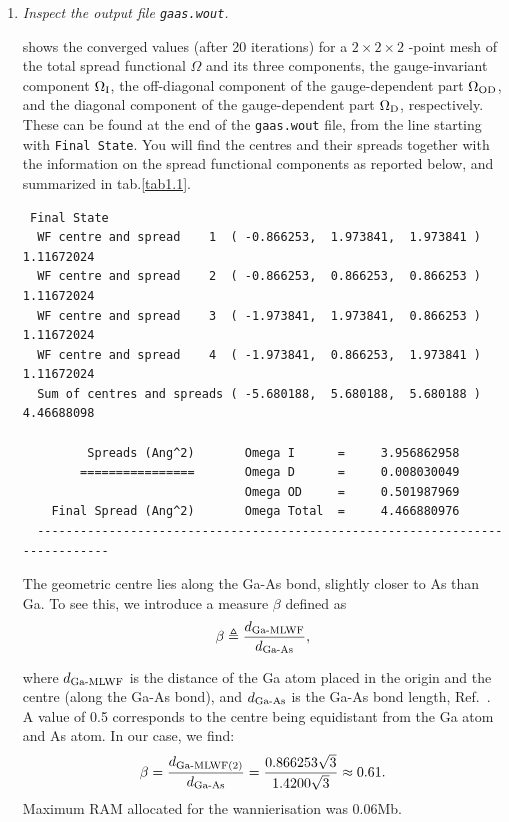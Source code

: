 \begin{enumerate}

\item {\it Inspect the output file {\tt gaas.wout}.}

 shows the converged values (after 20 iterations) for a $2\times2\times2$ \bfk-point mesh of the total spread functional $\Omega$ and its three components, \ie{} the gauge-invariant component $\Omega\tinysub{I}$, the off-diagonal component of the gauge-dependent part $\Omega\tinysub{OD}$, and the diagonal component of the gauge-dependent part $\Omega\tinysub{D}$, respectively. These can be found at the end of the {\tt gaas.wout} file, from the line starting with {\tt Final State}. You will find the \MLWF{} centres and their spreads together with the information on the spread functional components as reported below, and summarized in tab.\ref{tab1.1}.
\begin{tcolorbox}[sharp corners,boxrule=0.5pt]
{\small
\begin{verbatim}
 Final State
  WF centre and spread    1  ( -0.866253,  1.973841,  1.973841 )     1.11672024
  WF centre and spread    2  ( -0.866253,  0.866253,  0.866253 )     1.11672024
  WF centre and spread    3  ( -1.973841,  1.973841,  0.866253 )     1.11672024
  WF centre and spread    4  ( -1.973841,  0.866253,  1.973841 )     1.11672024
  Sum of centres and spreads ( -5.680188,  5.680188,  5.680188 )     4.46688098

         Spreads (Ang^2)       Omega I      =     3.956862958
        ================       Omega D      =     0.008030049
                               Omega OD     =     0.501987969
    Final Spread (Ang^2)       Omega Total  =     4.466880976
  -----------------------------------------------------------------------------
\end{verbatim}
}
\end{tcolorbox}
The geometric centre lies along the Ga-As bond, slightly closer to As than Ga. To see this, we introduce a measure $\beta$ defined as
$$\beta \triangleq \frac{d\tinysub{Ga-MLWF}}{d\tinysub{Ga-As}},$$

where $d\tinysub{Ga-MLWF}$ is the distance of the Ga atom placed in the origin and the \MLWF{} centre (along the Ga-As bond), and $d\tinysub{Ga-As}$ is the Ga-As bond length, \cf{} Ref.~\cite{marzarivanderbilt1997}. A value of 0.5 corresponds to the \MLWF{} centre being equidistant from the Ga atom and As atom.
In our case, we find: $$\beta = \frac{d\tinysub{Ga-MLWF(2)}}{d\tinysub{Ga-As}} = \frac{0.866253\sqrt{3}}{1.4200\sqrt{3}} \approx 0.61 .$$
Maximum RAM allocated for the wannierisation was 0.06Mb.


\end{enumerate}

